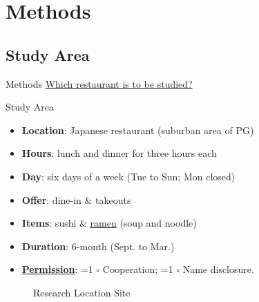 \documentclass{beamer}
\newcommand{\checkbox}[1]{%
  \ifnum#1=1
    \makebox[0pt][l]{\raisebox{0.15ex}{\hspace{0.1em}$\checkmark$}}%
  \fi
  $\square$%
}
\begin{document}
\section{Methods}
\subsection{Study Area}
\begin{frame}{Methods}
    \underline{Which restaurant is to be studied?}
    \begin{block}{Study Area}
        \begin{itemize}
            \small
            \item \textbf{Location}: Japanese restaurant (suburban area of PG)
            \item \textbf{Hours}: lunch and dinner for three hours each
            \item \textbf{Day}: six days of a week (Tue to Sun; Mon closed)
            \item \textbf{Offer}: dine-in \& takeouts
            \item \textbf{Items}: sushi \& \underline{ramen} (soup and noodle)
            \item \textbf{Duration}: 6-month (Sept. to Mar.)
            \item \underline{\textbf{Permission}}: 
            \checkbox{1} Cooperation; \checkbox{0} Name disclosure.
        \end{itemize}
    \end{block}
        \begin{figure}
            \centering
            \qquad
            \caption{Research Location Site}
        \end{figure}
\end{frame}

\end{document}
